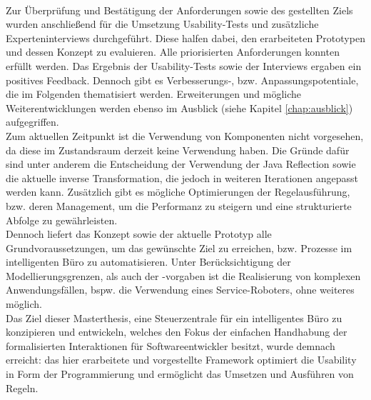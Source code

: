     \\
    \linebreak
    Zur Überprüfung und Bestätigung der Anforderungen sowie des gestellten Ziels wurden anschließend für die Umsetzung Usability-Tests und zusätzliche 
    Experteninterviews durchgeführt. Diese halfen dabei, den erarbeiteten Prototypen und dessen Konzept zu evaluieren. Alle priorisierten 
    Anforderungen konnten erfüllt werden. Das Ergebnis der Usability-Tests sowie der Interviews ergaben ein positives Feedback. Dennoch 
    gibt es Verbesserungs-, bzw. Anpassungspotentiale, die im Folgenden thematisiert werden. Erweiterungen und mögliche Weiterentwicklungen werden 
    ebenso im Ausblick (siehe Kapitel \ref{chap:ausblick}) aufgegriffen. 
    \\
    \linebreak 
    Zum aktuellen Zeitpunkt ist die Verwendung von Komponenten nicht vorgesehen, da diese im Zustandsraum derzeit keine Verwendung haben. Die 
    Gründe dafür sind unter anderem die Entscheidung der Verwendung der Java Reflection sowie die aktuelle inverse Transformation, die jedoch in weiteren 
    Iterationen angepasst werden kann. Zusätzlich gibt es mögliche Optimierungen der Regelausführung, bzw. deren Management, um die Performanz 
    zu steigern und eine strukturierte Abfolge zu gewährleisten.  
    \\
    Dennoch liefert das Konzept sowie der aktuelle Prototyp alle Grundvoraussetzungen, um das gewünschte Ziel zu 
    erreichen, bzw. Prozesse im intelligenten Büro zu automatisieren. Unter Berücksichtigung der Modellierungsgrenzen, als 
    auch der -vorgaben ist die Realisierung von komplexen Anwendungsfällen, bspw. die Verwendung eines 
    Service-Roboters, ohne weiteres möglich. 
    \\
    \linebreak
    Das Ziel dieser Masterthesis, eine Steuerzentrale für ein intelligentes Büro zu konzipieren und entwickeln, welches den Fokus der 
    einfachen Handhabung der formalisierten Interaktionen für Softwareentwickler besitzt, wurde demnach erreicht: das hier erarbeitete 
    und vorgestellte Framework optimiert die Usability in Form der Programmierung und ermöglicht das Umsetzen und Ausführen von Regeln. 
